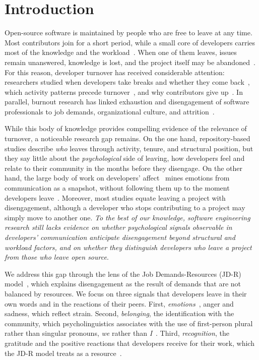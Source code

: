 \section{Introduction}
\label{sec:intro}

Open-source software is maintained by people who are free to leave at any time. Most contributors join for a short period, while a small core of developers carries most of the knowledge and the workload~\cite{joblin2017classifying,avelino2016novel}. When one of them leaves, issues remain unanswered, knowledge is lost, and the project itself may be abandoned~\cite{avelino2019abandonment}. For this reason, developer turnover has received considerable attention: researchers studied when developers take breaks and whether they come back~\cite{iaffaldano2019why,calefato2022will}, which activity patterns precede turnover~\cite{lin2017developer}, and why contributors give up~\cite{miller2019people}. In parallel, burnout research has linked exhaustion and disengagement of software professionals to job demands, organizational culture, and attrition~\cite{tulili2023burnout,trinkenreich2023model,trinkenreich2024attrition}.

While this body of knowledge provides compelling evidence of the relevance of turnover, a noticeable research gap remains. On the one hand, repository-based studies describe \textit{who} leaves through activity, tenure, and structural position, but they say little about the \textit{psychological} side of leaving, \ie how developers feel and relate to their community in the months before they disengage. On the other hand, the large body of work on developers' affect~\cite{novielli2019sentiment,calefato2018sentiment,imran2024uncovering} mines emotions from communication as a snapshot, without following them up to the moment developers leave~\cite{mantyla2016mining}. Moreover, most studies equate leaving a project with disengagement, although a developer who stops contributing to a project may simply move to another one. \textit{To the best of our knowledge, software engineering research still lacks evidence on whether psychological signals observable in developers' communication anticipate disengagement beyond structural and workload factors, and on whether they distinguish developers who leave a project from those who leave open source}.

We address this gap through the lens of the Job Demands-Resources (JD-R) model~\cite{demerouti2001job,bakker2007job}, which explains disengagement as the result of demands that are not balanced by resources. We focus on three signals that developers leave in their own words and in the reactions of their peers. First, \textit{emotions}~\cite{shaver1987emotion}, \eg anger and sadness, which reflect strain. Second, \textit{belonging}, \ie the identification with the community, which psycholinguistics associates with the use of first-person plural rather than singular pronouns, \ie \textit{we} rather than \textit{I}~\cite{tausczik2010psychological}. Third, \textit{recognition}, \ie the gratitude and the positive reactions that developers receive for their work, which the JD-R model treats as a resource~\cite{bakker2007job}.

